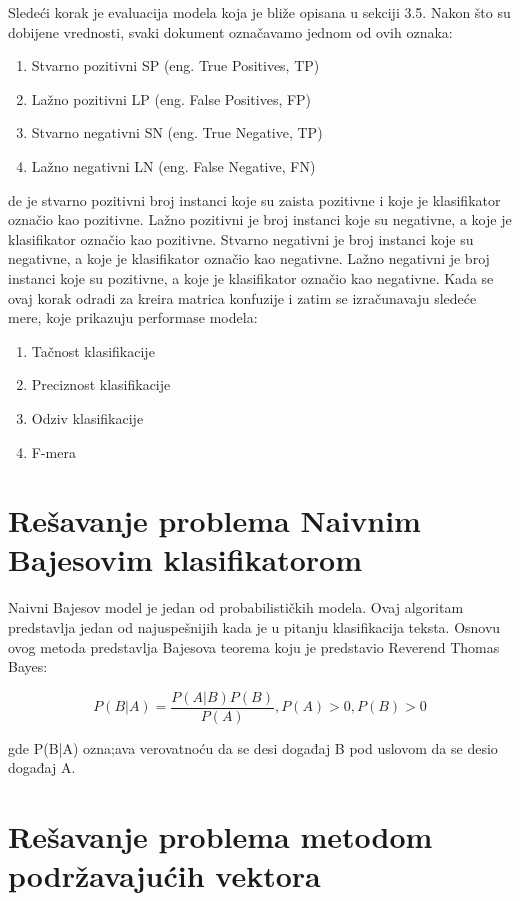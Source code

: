 \documentclass[12pt,oneside]{memoir}
\begin{document}
Sledeći korak je evaluacija modela koja je bliže opisana u sekciji 3.5. Nakon što su dobijene vrednosti,  svaki dokument označavamo jednom od ovih oznaka:

\begin{enumerate}
\item Stvarno pozitivni SP (eng. True Positives, TP)
\item Lažno pozitivni LP (eng.  False Positives,  FP)
\item Stvarno negativni SN (eng.  True Negative, TP)
\item Lažno negativni LN (eng.  False Negative, FN)
\end{enumerate}

de je stvarno pozitivni broj instanci koje su zaista pozitivne i koje je klasifikator označio kao pozitivne.  Lažno pozitivni je broj instanci koje su negativne, a koje je klasifikator označio kao pozitivne.  Stvarno negativni je broj instanci koje su negativne,  a koje je klasifikator označio kao negativne.  Lažno negativni je broj instanci koje su pozitivne, a koje je klasifikator označio kao negativne.  Kada se ovaj korak odradi za kreira matrica konfuzije i zatim se izračunavaju sledeće mere,  koje prikazuju performase modela:

\begin{enumerate}
\item Tačnost klasifikacije
\item Preciznost klasifikacije
\item Odziv klasifikacije
\item F-mera
\end{enumerate}

\chapter{Rešavanje problema Naivnim Bajesovim klasifikatorom}

Naivni Bajesov model je jedan od probabilističkih modela.  Ovaj algoritam predstavlja jedan od najuspešnijih kada je u pitanju klasifikacija teksta.  Osnovu ovog metoda predstavlja Bajesova teorema koju je predstavio Reverend Thomas Bayes:

\begin{equation}
	P(B|A) = \frac{P(A|B)P(B)}{P(A)}, P(A)>0, P(B)>0
\end{equation}

gde P(B|A) ozna;ava verovatnoću da se desi događaj B pod uslovom da se desio događaj A. 


\chapter{Rešavanje problema metodom podržavajućih vektora}
\end{document}

